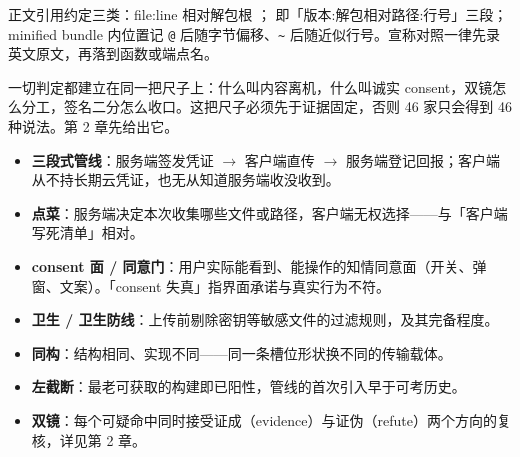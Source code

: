 正文引用约定三类：file:line 相对解包根 ； 即「版本:解包相对路径:行号」三段；minified bundle 内位置记 \texttt{@} 后随字节偏移、\texttt{\textasciitilde} 后随近似行号。宣称对照一律先录英文原文，再落到函数或端点名。

一切判定都建立在同一把尺子上：什么叫内容离机，什么叫诚实 consent，双镜怎么分工，签名二分怎么收口。这把尺子必须先于证据固定，否则 46 家只会得到 46 种说法。第 2 章先给出它。

\begin{tcolorbox}[colback=vmist!25,colframe=vgray!60,title=术语约定,fonttitle=\small\bfseries,fontupper=\small,sharp corners,boxrule=0.4pt,breakable]
\begin{itemize}
\item \textbf{三段式管线}：服务端签发凭证 $\to$ 客户端直传 $\to$ 服务端登记回报；客户端从不持长期云凭证，也无从知道服务端收没收到。
\item \textbf{点菜}：服务端决定本次收集哪些文件或路径，客户端无权选择——与「客户端写死清单」相对。
\item \textbf{consent 面 / 同意门}：用户实际能看到、能操作的知情同意面（开关、弹窗、文案）。「consent 失真」指界面承诺与真实行为不符。
\item \textbf{卫生 / 卫生防线}：上传前剔除密钥等敏感文件的过滤规则，及其完备程度。
\item \textbf{同构}：结构相同、实现不同——同一条槽位形状换不同的传输载体。
\item \textbf{左截断}：最老可获取的构建即已阳性，管线的首次引入早于可考历史。
\item \textbf{双镜}：每个可疑命中同时接受证成（evidence）与证伪（refute）两个方向的复核，详见第 2 章。
\end{itemize}
\end{tcolorbox}

